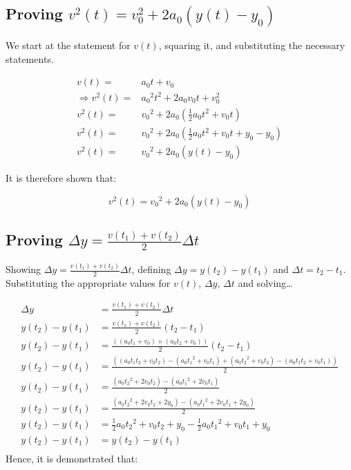 \documentclass[letterpaper]{article}
\begin{document}
\subsection{Proving \(v^2(t) = v_0^2 + 2a_0(y(t)-y_0)\)}
\label{sec:org93b5a02}
We start at the statement for \(v(t)\), squaring it, and substituting the necessary statements.

\begin{align}
    v(t) =& a_0t+v_0 \\
    \Rightarrow v^2(t) =& {a_0}^2 t^2 + 2a_0v_0t + v_0^2 \\
    v^2(t) =& {v_0}^2 + 2a_0 (\frac{1}{2} a_0 t^2 + v_0t) \\
    v^2(t) =& {v_0}^2 + 2a_0 (\frac{1}{2} a_0 t^2 + v_0t + y_0 - y_0) \\
    v^2(t) =& {v_0}^2 + 2a_0 (y(t) - y_0) 
\end{align}

It is therefore shown that:

\begin{equation}
    v^2(t) = {v_0}^2 + 2a_0 (y(t) - y_0) 
\end{equation}

\subsection{Proving \(\Delta y = \frac{v(t_1)+v(t_2)}{2}\Delta t\)}
\label{sec:orga3bacba}
Showing \(\Delta y = \frac{v(t_1)+v(t_2)}{2}\Delta t\), defining \(\Delta y=y(t_2)-y(t_1)\) and \(\Delta t = t_2 - t_1\). Substituting the appropriate values for \(v(t)\), \(\Delta y\), \(\Delta t\) and solving\ldots{}

\begin{align}
    \Delta y &= \frac{v(t_1)+v(t_2)}{2}\Delta t \\
    y(t_2)-y(t_1) &= \frac{v(t_1)+v(t_2)}{2} (t_2 - t_1) \\
    y(t_2)-y(t_1) &= \frac{((a_0t_1+v_0)+(a_0t_2+v_0))}{2} (t_2 - t_1) \\
    y(t_2)-y(t_1) &= \frac{((a_0t_1t_2+v_0t_2)-(a_0{t_1}^2+v_0t_1)+(a_0{t_2}^2+v_0t_2)-(a_0t_1t_2+v_0t_1))}{2} \\
    y(t_2)-y(t_1) &= \frac{(a_0{t_2}^2+2v_0t_2)-(a_0{t_1}^2+2v_0t_1)}{2} \\
    y(t_2)-y(t_1) &= \frac{(a_0{t_2}^2+2v_0t_2+2y_0)-(a_0{t_1}^2+2v_0t_1+2y_0)}{2} \\
    y(t_2)-y(t_1) &= \frac{1}{2} a_0{t_2}^2+v_0t_2+y_0 - \frac{1}{2} a_0{t_1}^2+v_0t_1+y_0 \\
    y(t_2)-y(t_1) &= y(t_2) - y(t_1) \\
\end{align}
Hence, it is demonstrated that: 
\end{document}
